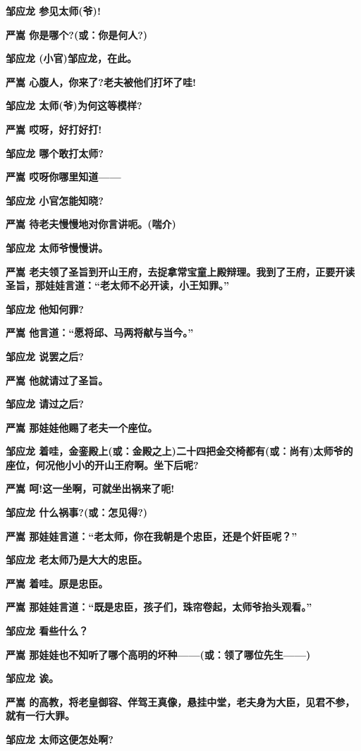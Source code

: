 \textbf{邹应龙 参见太师(爷)!}

\textbf{严嵩 你是哪个?(或：你是何人?)}

\textbf{邹应龙 (小官)邹应龙，在此。}

\textbf{严嵩 心腹人，你来了?老夫被他们打坏了哇!}

\textbf{邹应龙 太师(爷)为何这等模样?}

\textbf{严嵩 哎呀，好打好打!}

\textbf{邹应龙 哪个敢打太师?}

\textbf{严嵩 哎呀你哪里知道------}

\textbf{邹应龙 小官怎能知晓?}

\textbf{严嵩 待老夫慢慢地对你言讲呃。(喘介)}

\textbf{邹应龙 太师爷慢慢讲。}

\textbf{严嵩
老夫领了圣旨到开山王府，去捉拿常宝童上殿辩理。我到了王府，正要开读圣旨，那娃娃言道：``老太师不必开读，小王知罪。''}

\textbf{邹应龙 他知何罪?}

\textbf{严嵩 他言道：``愿将邱、马两将献与当今。''}

\textbf{邹应龙 说罢之后?}

\textbf{严嵩 他就请过了圣旨。}

\textbf{邹应龙 请过之后?}

\textbf{严嵩 那娃娃他赐了老夫一个座位。}

\textbf{邹应龙
着哇，金銮殿上(或：金殿之上)二十四把金交椅都有(或：尚有)太师爷的座位，何况他小小的开山王府啊。坐下后呢?}

\textbf{严嵩 呵!这一坐啊，可就坐出祸来了呃!}

\textbf{邹应龙 什么祸事?(或：怎见得?)}

\textbf{严嵩 那娃娃言道：``老太师，你在我朝是个忠臣，还是个奸臣呢？''}

\textbf{邹应龙 老太师乃是大大的忠臣。}

\textbf{严嵩 着哇。原是忠臣。}

\textbf{严嵩
那娃娃言道：``既是忠臣，孩子们，珠帘卷起，太师爷抬头观看。''}

\textbf{邹应龙 看些什么？}

\textbf{严嵩
那娃娃也不知听了哪个高明的坏种------(或：领了哪位先生------)}

\textbf{邹应龙 诶。}

\textbf{严嵩
的高教，将老皇御容、伴驾王真像，悬挂中堂，老夫身为大臣，见君不参，就有一行大罪。}

\textbf{邹应龙 太师这便怎处啊?}

